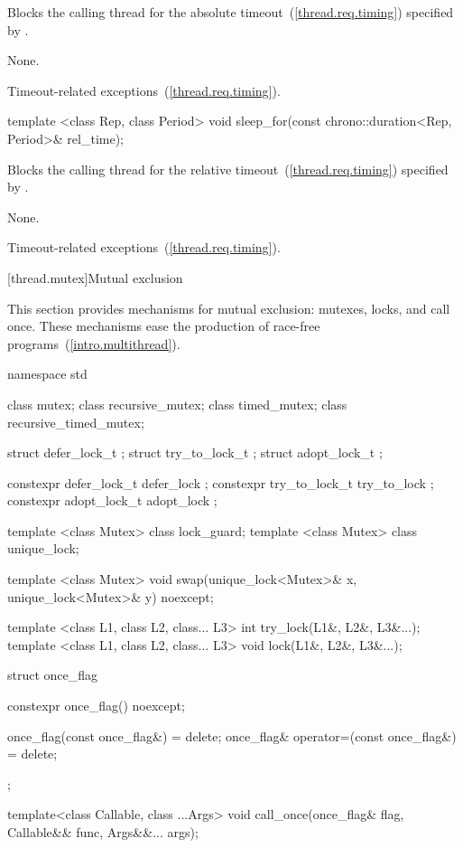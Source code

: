 \begin{itemdescr}
\pnum
\effects Blocks the calling thread for the absolute timeout~(\ref{thread.req.timing}) specified
by .

\pnum
\sync None.

\pnum
\throws Timeout-related exceptions~(\ref{thread.req.timing}).
\end{itemdescr}

%
%
\begin{itemdecl}
template <class Rep, class Period>
  void sleep_for(const chrono::duration<Rep, Period>& rel_time);
\end{itemdecl}

\begin{itemdescr}
\pnum
\effects Blocks the calling thread for the relative timeout~(\ref{thread.req.timing}) specified
by .

\pnum
\sync None.

\pnum
\throws Timeout-related exceptions~(\ref{thread.req.timing}).
\end{itemdescr}

[thread.mutex]{Mutual exclusion}

\pnum
This section provides mechanisms for mutual exclusion: mutexes, locks, and call
once. These mechanisms ease the production of race-free
programs~(\ref{intro.multithread}).

%

\begin{codeblock}
namespace std {
  class mutex;
  class recursive_mutex;
  class timed_mutex;
  class recursive_timed_mutex;

  struct defer_lock_t { };
  struct try_to_lock_t { };
  struct adopt_lock_t { };

  constexpr defer_lock_t  defer_lock { };
  constexpr try_to_lock_t try_to_lock { };
  constexpr adopt_lock_t  adopt_lock { };

  template <class Mutex> class lock_guard;
  template <class Mutex> class unique_lock;

  template <class Mutex>
    void swap(unique_lock<Mutex>& x, unique_lock<Mutex>& y) noexcept;

  template <class L1, class L2, class... L3> int try_lock(L1&, L2&, L3&...);
  template <class L1, class L2, class... L3> void lock(L1&, L2&, L3&...);

  struct once_flag {
    constexpr once_flag() noexcept;

    once_flag(const once_flag&) = delete;
    once_flag& operator=(const once_flag&) = delete;
  };

  template<class Callable, class ...Args>
    void call_once(once_flag& flag, Callable&& func, Args&&... args);
}
\end{codeblock}

